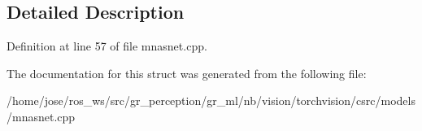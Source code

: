 \subsection{Detailed Description}


Definition at line 57 of file mnasnet.\+cpp.



The documentation for this struct was generated from the following file\+:\begin{DoxyCompactItemize}
\item 
/home/jose/ros\+\_\+ws/src/gr\+\_\+perception/gr\+\_\+ml/nb/vision/torchvision/csrc/models/mnasnet.\+cpp\end{DoxyCompactItemize}
